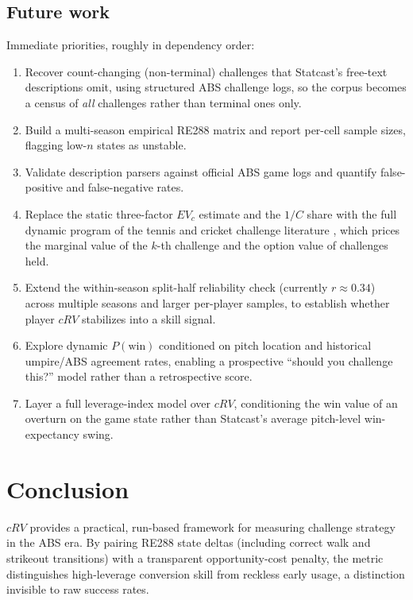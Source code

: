\subsection{Future work}
\label{sec:future}
Immediate priorities, roughly in dependency order:
\begin{enumerate}
  \item Recover count-changing (non-terminal) challenges that Statcast's
        free-text descriptions omit, using structured ABS challenge logs, so the
        corpus becomes a census of \emph{all} challenges rather than terminal
        ones only.
  \item Build a multi-season empirical RE288 matrix and report per-cell sample
        sizes, flagging low-$n$ states as unstable.
  \item Validate description parsers against official ABS game logs and
        quantify false-positive and false-negative rates.
  \item Replace the static three-factor $EV_c$ estimate and the $1/C$ share
        with the full dynamic program of the tennis and cricket challenge
        literature \citep{abramitzky2012,clarkenorman2012,shivakumar2018},
        which prices the marginal value of the $k$-th challenge and the option
        value of challenges held.
  \item Extend the within-season split-half reliability check (currently
        $r \approx 0.34$) across multiple seasons and larger per-player
        samples, to establish whether player $cRV$ stabilizes into a skill
        signal.
  \item Explore dynamic $P(\text{win})$ conditioned on pitch location and
        historical umpire/ABS agreement rates, enabling a prospective
        ``should you challenge this?'' model rather than a retrospective score.
  \item Layer a full leverage-index model over $cRV$, conditioning the win
        value of an overturn on the game state rather than Statcast's average
        pitch-level win-expectancy swing.
\end{enumerate}

\section{Conclusion}
$cRV$ provides a practical, run-based framework for measuring challenge
strategy in the ABS era. By pairing RE288 state deltas (including correct walk
and strikeout transitions) with a transparent opportunity-cost penalty, the
metric distinguishes high-leverage conversion skill from reckless early usage,
a distinction invisible to raw success rates.

